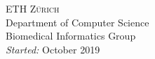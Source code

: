 \begin{titlepage}


\textsc{ETH Z\"{u}rich} \\
Department of Computer Science\\
Biomedical Informatics Group\\
\emph{Started:} October 2019\\


 

\vfill %

\end{titlepage}
